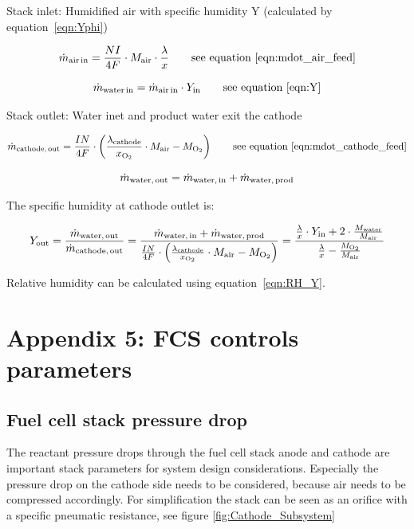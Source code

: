 \documentclass[11pt,a4paper,english,twoside]{scrreprt}
\begin{document}
Stack inlet: Humidified air with specific humidity Y (calculated by equation~\ref{eqn:Yphi})

\[\dot m_\text{air\,in} =\frac{N I}{4 F} \cdot M_\text{air} \cdot \frac{\lambda}{x}    \qquad \mbox{see equation~\ref{eqn:mdot_air_feed}}\]

\[\dot m_\text{water\,in} = \dot m_\text{air\,in} \cdot Y_\text{in} \qquad \mbox{see equation~\ref{eqn:Y}}\]


Stack outlet: Water inet and product water exit the cathode

\[
  \dot m_\text{cathode,\,out} = \frac{I N}{4 F} \cdot \left( \frac{\lambda_\text{cathode}}{x_{\ce{O2}}} \cdot M_\text{air} - M_{\ce{O2}} \right)
  \qquad \mbox{see equation~\ref{eqn:mdot_cathode_feed}}
\]


\[\dot m_\text{water,\,out} = \dot m_\text{water,\,in} + \dot m_\text{water,\,prod} \]


The specific humidity at cathode outlet is:

\[
Y_\text{out} = \frac{\dot m_\text{water,\,out}}{\dot m_\text{cathode,\,out}}
              = \frac{\dot m_\text{water,\,in} + \dot m_\text{water,\,prod}}{\frac{I N}{4 F} \cdot \left(\frac{\lambda_\text{cathode}}{x_{\ce{O2}}} \cdot M_\text{air} - M_{\ce{O2}}\right)} = \frac{\frac{\lambda}{x} \cdot Y_\text{in} + 2\cdot \frac{M_\text{water}}{M_\text{air}}}{\frac{\lambda}{x}-\frac{M_{\ce{O2}}}{M_\text{air}}}
\]


Relative humidity can be calculated using equation~\ref{eqn:RH_Y}.

\chapter{Appendix 5: FCS controls parameters}
\label{chap:Fuel cell stack pressure drop}

\section{Fuel cell stack pressure drop}

The reactant pressure drops through the fuel cell stack anode and cathode are important stack parameters for system design considerations. Especially the pressure drop on the cathode side needs to be considered, because air needs to be compressed accordingly. For simplification the stack can be seen as an orifice with a specific pneumatic resistance, see figure \ref{fig:Cathode_Subsystem}
\end{document}
